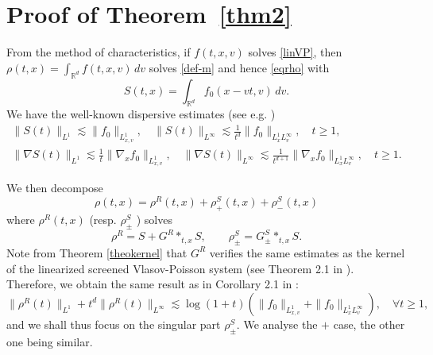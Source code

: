 \documentclass[11pt]{amsart}
\numberwithin{equation}{section}
\newcommand{\R}{\mathbb{R}}
\newcommand{\na}{\nabla}
\begin{document}
\section{Proof of Theorem~\ref{thm2}}
 From the  method of characteristics,  if $f(t,x,v)$ solves \eqref{linVP}, then 
 $\rho(t,x)=\int_{\R^d} f(t,x,v)\, dv$ solves  \eqref{def-m} and hence \eqref{eqrho}
 with
 $$ S(t,x) = \int_{\R^d} f_{0}(x-vt, v) \, dv.$$
 We have the well-known dispersive estimates (see e.g. \cite{BD})
 \begin{equation}
 \label{sourceestimates}
\begin{aligned}
\| S(t)  \|_{L^1} \lesssim \| f_0 \|_{ L^1_{x,v}}, \quad  \| S(t)  \|_{L^\infty} \lesssim \frac{1}{t^d} \| f_0 \|_{ L^1_{x} L^\infty_{v}}, \quad t \geq 1, \\
 \| \na S(t)  \|_{L^1} \lesssim  \frac{1}{t} \| \nabla _x  f_0 \|_{ L^1_{x,v}}, \quad  \| \na S(t)  \|_{L^\infty} \lesssim \frac{1}{t^{d+1}} \| \nabla_x f_0 \|_{ L^1_{x} L^\infty_{v}}, \quad t \geq 1.
\end{aligned}
\end{equation}

   We then decompose
   $$ \rho(t,x)= \rho^{R}(t,x) + \rho^S_{+}(t,x)+ \rho^S_{-}(t,x)$$
   where $\rho^{R}(t,x)$ (resp. $\rho^S_{\pm}$ )
    solves
   $$ \rho^{R}= S + G^{R} *_{t,x}  S, \qquad \rho^{S}_{\pm}=  G^{S}_{\pm} *_{t,x} S. $$
    Note from Theorem \ref{theokernel} that $G^R$ verifies the same estimates as the kernel  of the linearized screened Vlasov-Poisson system
    (see Theorem 2.1 in \cite{HNR}). Therefore, we obtain the same result as in Corollary 2.1 in \cite{HNR}:
    $$ \|\rho^{R}(t) \|_{L^1} + t^d   \|\rho^{R}(t) \|_{L^\infty} \lesssim \log(1+t)\left(\| f_0 \|_{ L^1_{x,v}} + \| f_0 \|_{ L^1_x L^\infty_{v}}\right), \quad \forall t \geq 1, $$
    and we shall thus focus on the  singular part $\rho^S_{\pm}.$ We analyse the $+$ case, the other one being similar.
 
\end{document}
